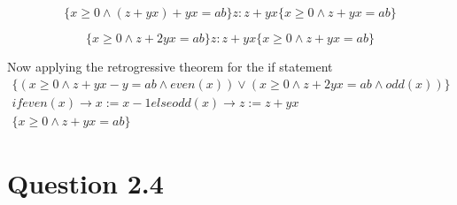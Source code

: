 \documentclass[10pt,a4paper]{article}
\begin{document}
\begin{equation}
\{x\geq 0 \wedge (z+yx) + yx = ab \}z:z+yx\{x\geq 0 \wedge z + yx = ab \}
\end{equation}

\begin{equation}
\{x\geq 0 \wedge z+ 2yx = ab \}z:z+yx\{x\geq 0 \wedge z + yx = ab \}
\end{equation}

Now applying the retrogressive theorem for the if statement
\begin{equation}
\begin{split}
 \{(x\geq 0 \wedge z + yx-y = ab \wedge even(x) )\vee (x\geq 0 \wedge z+ 2yx = ab \wedge odd(x))\}\\ if  even(x) \rightarrow x:=x-1 else  odd(x) \rightarrow z:= z+yx \\ \{x\geq 0 \wedge z + yx = ab \}
\end{split}
 \end{equation}

\section{Question 2.4}
\end{document}
